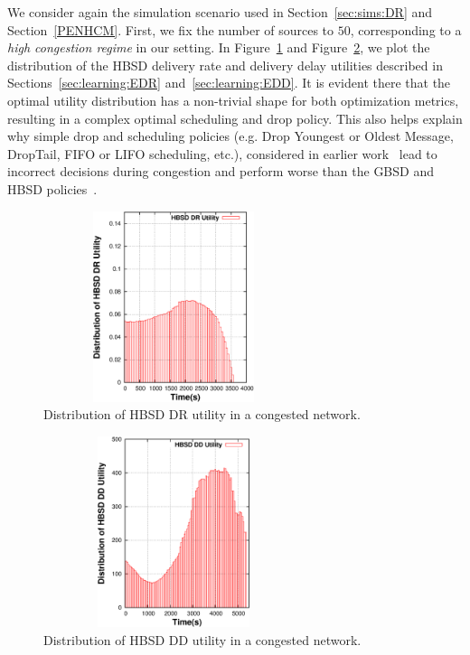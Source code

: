 We consider again the simulation scenario used in Section~\ref{sec:sims:DR} and Section~\ref{PENHCM}. First, we fix the number of sources to $50$, corresponding to a \emph{high congestion regime} in our setting. In Figure~\ref{HBSD-DR-HCN} and Figure~\ref{HBSD-DD-HCN}, we plot the distribution of the HBSD delivery rate and delivery delay utilities described in Sections~\ref{sec:learning:EDR} and~\ref{sec:learning:EDD}. It is evident there that the optimal utility distribution has a non-trivial shape for both optimization metrics, resulting in a complex optimal scheduling and drop policy. This also helps explain why simple drop and scheduling policies (e.g. Drop Youngest or Oldest Message, DropTail, FIFO or LIFO scheduling, etc.), considered in earlier work~\cite{Towsley:Epidemic, KrifaBS08} lead to incorrect decisions during congestion and perform worse than the GBSD and HBSD policies~\cite{KrifaBS08}.

\begin{figure}[!h]
  \begin{center}
    \includegraphics[width=3in,height=2.2in]{Chapitre3/fig18.eps}
  \end{center}
  \caption{Distribution of HBSD DR utility in a congested network.}
  \label{HBSD-DR-HCN}
\end{figure}

\begin{figure}[!h]
  \begin{center}
    \includegraphics[width=3in,height=2.2in]{Chapitre3/fig16.eps}
  \end{center}
  \caption{Distribution of HBSD DD utility in a congested network.}
  \label{HBSD-DD-HCN}
\end{figure}

